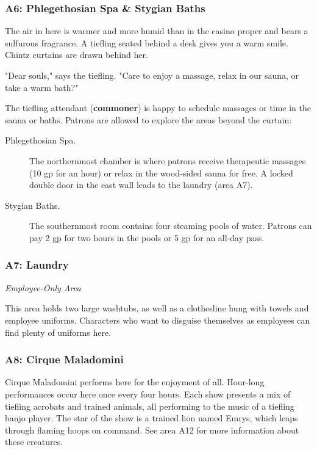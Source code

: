 \documentclass[10pt,a4paper,twoside,bg=print,twocolumn,openany,nodeprecatedcode]{dndbook}
\begin{document}
\subsubsection{A6: Phlegethosian Spa \& Stygian Baths}
\begin{DndReadAloud}{}
The air in here is warmer and more humid than in the casino proper and bears a sulfurous fragrance. A tiefling seated behind a desk gives you a warm smile. Chintz curtains are drawn behind her.

"Dear souls," says the tiefling. "Care to enjoy a massage, relax in our sauna, or take a warm bath?"

\end{DndReadAloud}

The tiefling attendant (\textbf{commoner}) is happy to schedule massages or time in the sauna or baths. Patrons are allowed to explore the areas beyond the curtain:


\begin{description}
\item[Phlegethosian Spa.]
The northernmost chamber is where patrons receive therapeutic massages (10 gp for an hour) or relax in the wood-sided sauna for free. A locked double door in the east wall leads to the laundry (area A7).
\item[Stygian Baths.]
The southernmost room contains four steaming pools of water. Patrons can pay 2 gp for two hours in the pools or 5 gp for an all-day pass.
\end{description}

\subsubsection{A7: Laundry}
\textit{Employee-Only Area}

This area holds two large washtubs, as well as a clothesline hung with towels and employee uniforms. Characters who want to disguise themselves as employees can find plenty of uniforms here.

\subsubsection{A8: Cirque Maladomini}
Cirque Maladomini performs here for the enjoyment of all. Hour-long performances occur here once every four hours. Each show presents a mix of tiefling acrobats and trained animals, all performing to the music of a tiefling banjo player. The star of the show is a trained lion named Emrys, which leaps through flaming hoops on command. See area A12 for more information about these creatures.
\end{document}
